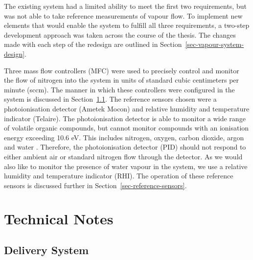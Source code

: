 \documentclass[
  a4paper,
]{scrbook}
\begin{document}
The existing system had a limited ability to meet the first two
requirements, but was not able to take reference measurements of vapour
flow. To implement new elements that would enable the system to fulfill
all three requirements, a two-step development approach was taken across
the course of the thesis. The changes made with each step of the
redesign are outlined in Section~\ref{sec-vapour-system-design}.

Three mass flow controllers (MFC) were used to precisely control and
monitor the flow of nitrogen into the system in units of standard cubic
centimeters per minute (sccm). The manner in which these controllers
were configured in the system is discussed in
Section~\ref{sec-delivery-system}. The reference sensors chosen were a
photoionisation detector (Ametek Mocon) and relative humidity and
temperature indicator (Telaire). The photoionisation detector is able to
monitor a wide range of volatile organic compounds, but cannot monitor
compounds with an ionisation energy exceeding 10.6 eV. This includes
nitrogen, oxygen, carbon dioxide, argon and water
\autocite{PIDmanual,Ionscience}. Therefore, the photoionisation detector
(PID) should not respond to either ambient air or standard nitrogen flow
through the detector. As we would also like to monitor the presence of
water vapour in the system, we use a relative humidity and temperature
indicator (RHI). The operation of these reference sensors is discussed
further in Section~\ref{sec-reference-sensors}.

\hypertarget{technical-notes}{%
\section{Technical Notes}\label{technical-notes}}

\hypertarget{sec-delivery-system}{%
\subsection{Delivery System}\label{sec-delivery-system}}
\end{document}
